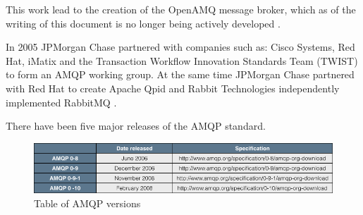 \documentclass{thesis}
\begin{document}
This work lead to the creation of the OpenAMQ message broker, which as of the writing of this document is no longer being actively developed \cite{OPEN_AMQ}. 

In 2005 JPMorgan Chase partnered with companies such as: Cisco Systems, Red Hat, iMatix and the Transaction Workflow Innovation Standards Team (TWIST) to form an AMQP working group.  At the same time JPMorgan Chase partnered with Red Hat to create Apache Qpid \cite{QPID_HOMEPAGE} and Rabbit Technologies independently implemented RabbitMQ \cite{RABBITMQ}.

There have been five major releases of the AMQP standard.

\begin{figure}
\centering
\vspace{2.0in} 
\includegraphics[scale=.5]{amqp_versions}  
\caption{Table of AMQP versions }
\label{Figure 1}  
\end{figure}

\end{document}

